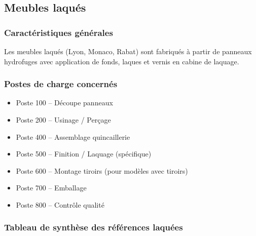 \documentclass[12pt,a4paper]{article}
\begin{document}
\subsection{Meubles laqués}

\subsubsection{Caractéristiques générales}
Les meubles laqués (Lyon, Monaco, Rabat) sont fabriqués à partir de panneaux hydrofuges avec application de fonds, laques et vernis en cabine de laquage.

\subsubsection{Postes de charge concernés}
\begin{itemize}
    \item Poste 100 – Découpe panneaux
    \item Poste 200 – Usinage / Perçage
    \item Poste 400 – Assemblage quincaillerie
    \item Poste 500 – Finition / Laquage (spécifique)
    \item Poste 600 – Montage tiroirs (pour modèles avec tiroirs)
    \item Poste 700 – Emballage
    \item Poste 800 – Contrôle qualité
\end{itemize}

\subsubsection{Tableau de synthèse des références laquées}
\end{document}
